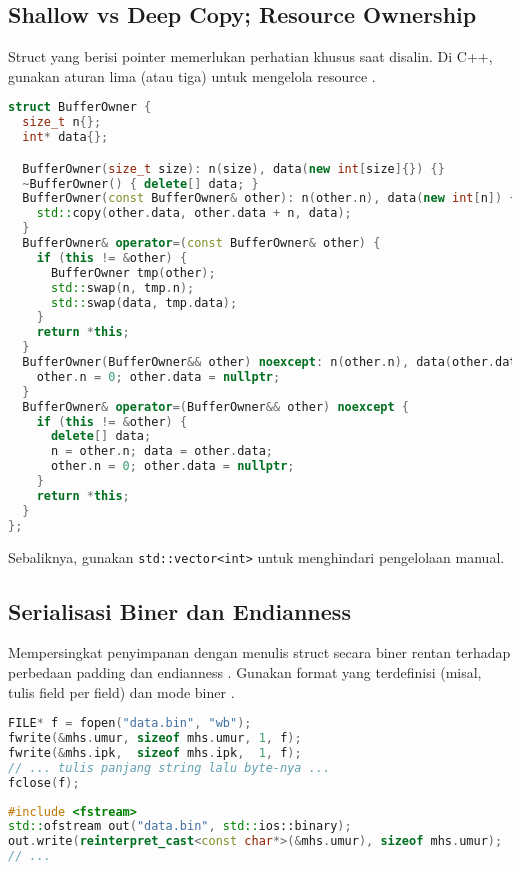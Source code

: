 \documentclass[../main.tex]{subfiles}
\begin{document}
\subsection{Shallow vs Deep Copy; Resource Ownership}
Struct yang berisi pointer memerlukan perhatian khusus saat disalin. Di C++, gunakan aturan lima (atau tiga) untuk mengelola resource \parencite{cpp-special-member-functions}.

\begin{lstlisting}[language=C++, caption={Aturan lima untuk kepemilikan resource}]
struct BufferOwner {
  size_t n{};
  int* data{};

  BufferOwner(size_t size): n(size), data(new int[size]{}) {}
  ~BufferOwner() { delete[] data; }
  BufferOwner(const BufferOwner& other): n(other.n), data(new int[n]) {
    std::copy(other.data, other.data + n, data);
  }
  BufferOwner& operator=(const BufferOwner& other) {
    if (this != &other) {
      BufferOwner tmp(other);
      std::swap(n, tmp.n);
      std::swap(data, tmp.data);
    }
    return *this;
  }
  BufferOwner(BufferOwner&& other) noexcept: n(other.n), data(other.data) {
    other.n = 0; other.data = nullptr;
  }
  BufferOwner& operator=(BufferOwner&& other) noexcept {
    if (this != &other) {
      delete[] data;
      n = other.n; data = other.data;
      other.n = 0; other.data = nullptr;
    }
    return *this;
  }
};
\end{lstlisting}

Sebaliknya, gunakan \texttt{std::vector<int>} untuk menghindari pengelolaan manual.

\subsection{Serialisasi Biner dan Endianness}
Mempersingkat penyimpanan dengan menulis struct secara biner rentan terhadap perbedaan padding dan endianness \parencite{endianness-wiki}. Gunakan format yang terdefinisi (misal, tulis field per field) dan mode biner \parencite{c-fwrite,cpp-openmode-binary}.

\begin{lstlisting}[language=C, caption={Tulis baca biner per-field (C)}]
FILE* f = fopen("data.bin", "wb");
fwrite(&mhs.umur, sizeof mhs.umur, 1, f);
fwrite(&mhs.ipk,  sizeof mhs.ipk,  1, f);
// ... tulis panjang string lalu byte-nya ...
fclose(f);
\end{lstlisting}

\begin{lstlisting}[language=C++, caption={Mode biner di C++}]
#include <fstream>
std::ofstream out("data.bin", std::ios::binary);
out.write(reinterpret_cast<const char*>(&mhs.umur), sizeof mhs.umur);
// ...
\end{lstlisting}
\end{document}
